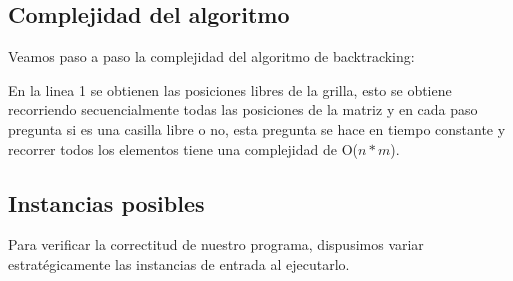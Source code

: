 \subsection{Complejidad del algoritmo}

Veamos paso a paso la complejidad del algoritmo de backtracking:

En la linea 1 se obtienen las posiciones libres de la grilla, esto se obtiene recorriendo secuencialmente todas las posiciones de la matriz y en cada paso pregunta si es una casilla libre o no, esta pregunta se hace en tiempo constante y recorrer todos los elementos tiene una complejidad de O($n*m$).



\subsection{Instancias posibles}
Para verificar la correctitud de nuestro programa, dispusimos variar estratégicamente las instancias de entrada al ejecutarlo.
